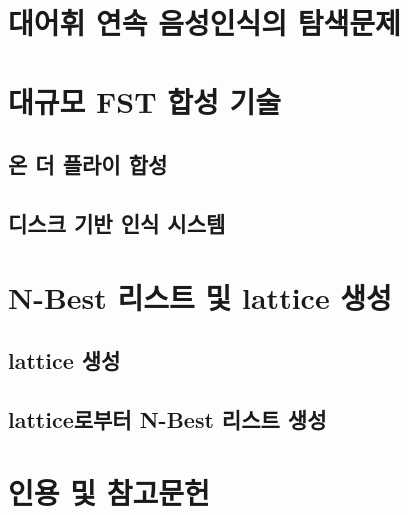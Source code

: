 \documentclass[../main.tex]{subfiles}
\begin{document}
\section{대어휘 연속 음성인식의 탐색문제}

\section{대규모 FST 합성 기술}
\subsection{온 더 플라이 합성}
\subsection{디스크 기반 인식 시스템}

\section{N-Best 리스트 및 lattice 생성}
\subsection{lattice 생성}
\subsection{lattice로부터 N-Best 리스트 생성}

\section*{인용 및 참고문헌}
\end{document}
